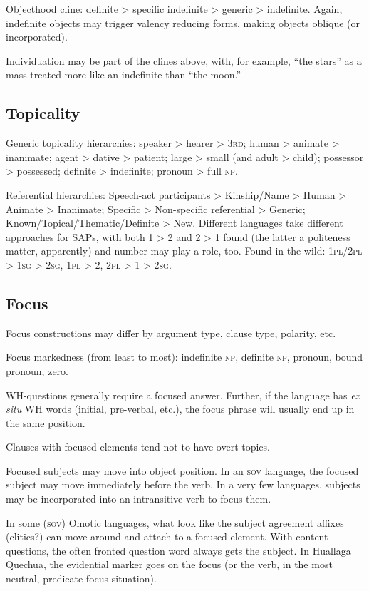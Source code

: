 \documentclass[11pt]{article}
\newcommand{\I}[1]{\textsc{#1}}   %
\begin{document}
Objecthood cline: definite > specific indefinite > generic >
indefinite.  Again, indefinite objects may trigger valency reducing
forms, making objects oblique (or incorporated).

Individuation may be part of the clines above, with, for example,
``the stars'' as a mass treated more like an indefinite than ``the
moon.'' 


\subsection{Topicality}
Generic topicality hierarchies: speaker > hearer > \I{3rd}; human >
animate > inanimate; agent > dative > patient; large > small (and
adult > child); possessor > possessed; definite > indefinite; pronoun
> full \I{np}.

Referential hierarchies: Speech-act participants > Kinship/Name >
Human > Animate > Inanimate; Specific > Non-specific referential >
Generic; Known/Topical/Thematic/Definite > New.  Different languages
take different approaches for SAPs, with both 1 > 2 and 2 > 1 found
(the latter a politeness matter, apparently) and number may play a
role, too. Found in the wild: \I{1pl/2pl > 1sg > 2sg}, \I{1pl > 2},
\I{2pl > 1 > 2sg}.

\subsection{Focus}
Focus constructions may differ by argument type, clause type,
polarity, etc.

Focus markedness (from least to most): indefinite \I{np}, definite
\I{np}, pronoun, bound pronoun, zero.

WH-questions generally require a focused answer.  Further, if the
language has \textit{ex situ} WH words (initial, pre-verbal, etc.),
the focus phrase will usually end up in the same position.

Clauses with focused elements tend not to have overt topics.

Focused subjects may move into object position. In an \I{sov}
language, the focused subject may move immediately before the verb.
In a very few languages, subjects may be incorporated into an
intransitive verb to focus them.

In some (\I{sov}) Omotic languages, what look like the subject
agreement affixes (clitics?) can move around and attach to a focused
element.  With content questions, the often fronted question word
always gets the subject.  In Huallaga Quechua, the evidential marker
goes on the focus (or the verb, in the most neutral, predicate focus
situation).
\end{document}
